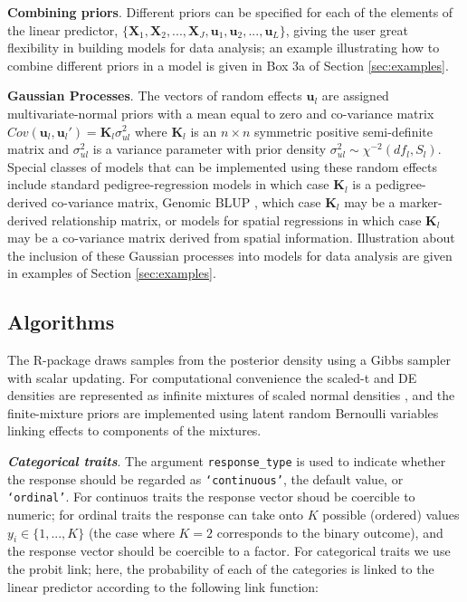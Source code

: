 \documentclass[article,shortnames,nojss]{jss}
\begin{document}
\textbf{Combining priors}. Different priors can be specified for each of the elements of the linear predictor, 
$\{\boldsymbol{X}_1,\boldsymbol{X}_2,...,\boldsymbol{X}_J, \boldsymbol{u}_1,\boldsymbol{u}_2,...,\boldsymbol{u}_L\}$, 
giving the user great flexibility in building models for data analysis;
an example illustrating how to combine different priors in a model is given in Box 3a of Section \ref{sec:examples}.

\textbf{Gaussian Processes}. The vectors of random effects 
$\boldsymbol u_l$ are assigned multivariate-normal 
priors with a mean equal to zero and co-variance matrix 
$Cov(\boldsymbol u_l,\boldsymbol u_l')=\boldsymbol K_l \sigma_{ul}^2$ 
where $\boldsymbol K_l$ is an 
$n \times n$ symmetric positive semi-definite matrix 
and $\sigma_{ul}^2$ is a variance parameter with prior 
density $\sigma_{ul}^2 \sim \chi^{-2} (df_l,S_l)$.  Special classes 
of models that can be implemented using these random effects include 
standard pedigree-regression models \citep{Henderson:1975} in which 
case $\boldsymbol K_l$ is a pedigree-derived co-variance matrix, 
Genomic BLUP \citep{VanRaden:2008}, which case $\boldsymbol K_l$ may 
be a marker-derived relationship matrix, or models for 
spatial regressions \citep{Cressie:1988} in which case  
$\boldsymbol K_l$ may be a co-variance matrix 
derived from spatial information. Illustration about the 
inclusion of these Gaussian processes into models for 
data analysis are given in examples of Section \ref{sec:examples}.

\subsection{Algorithms}

The R-package  draws samples from the posterior density using a 
Gibbs sampler  \citep{Geman:1984,Casella:1992} with scalar updating. 
For computational convenience the scaled-t and DE densities 
are represented as infinite mixtures of scaled normal 
densities \citep{Andrews:1974}, and the finite-mixture
priors are implemented using latent random Bernoulli variables linking effects
to components of the mixtures. 

\textbf{\emph{Categorical traits}}.  The argument \texttt{response\_type} 
is used to indicate  whether the response should be 
regarded as \texttt{`continuous'}, the default value, or \texttt{`ordinal'}. For continuos traits the
response vector shoud be coercible to numeric; for ordinal traits the response can take onto $K$ possible (ordered) values 
$y_i \in \{1,...,K\}$ (the case where $K=2$ corresponds to the 
binary outcome), and the response vector should be coercible to a factor. For categorical traits
we use the probit link; here, the probability of 
each of the categories is linked to the linear 
predictor according to the following link function:
\end{document}
